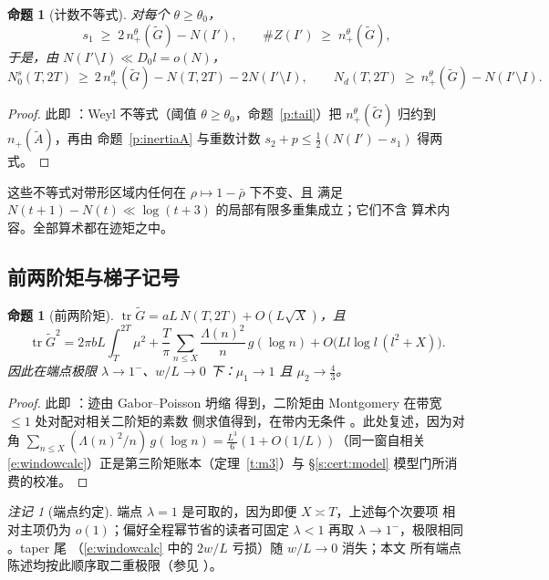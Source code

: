 \documentclass[11pt]{article}
\numberwithin{equation}{section}
\newtheorem{proposition}[theorem]{命题}
\theoremstyle{definition}
\theoremstyle{remark}
\newtheorem{remark}[theorem]{注记}
\newcommand{\LL}{\Lambda}
\begin{document}
\begin{proposition}[计数不等式]\label{p:count}
对每个 $\theta\ge\theta_0$，
\[
s_1\;\ge\;2\,n_+^{\theta}(\widetilde G)-N(I'),
\qquad
\#Z(I')\;\ge\;n_+^{\theta}(\widetilde G),
\]
于是，由 $N(I'\setminus I)\ll D_0l=o(N)$，
\begin{equation}\label{e:count}
N_0^{s}(T,2T)\ \ge\ 2\,n_+^{\theta}(\widetilde G)
-N(T,2T)-2N(I'\setminus I),
\qquad
N_d(T,2T)\ \ge\ n_+^{\theta}(\widetilde G)
-N(I'\setminus I).
\end{equation}
\end{proposition}

\begin{proof}
此即 \cite[命题~4.5]{C26}：Weyl 不等式（阈值
$\theta\ge\theta_0$，命题~\ref{p:tail}）把
$n_+^{\theta}(\widetilde G)$ 归约到 $n_+(\widetilde A)$，再由
命题~\ref{p:inertiaA} 与重数计数
$s_2+p\le\tfrac12(N(I')-s_1)$ 得两式。
\end{proof}

这些不等式对带形区域内任何在 $\rho\mapsto1-\bar\rho$ 下不变、且
满足 $N(t+1)-N(t)\ll\log(t+3)$ 的局部有限多重集成立；它们不含
算术内容。全部算术都在迹矩之中。

\subsection{前两阶矩与梯子记号}\label{s:frame:moments}

\begin{proposition}[前两阶矩]\label{p:mu12}
$\operatorname{tr}\widetilde G=aL\,N(T,2T)+O(L\sqrt X)$，且
\[
\operatorname{tr}\widetilde G^{2}
=2\pi bL\int_T^{2T}\mu^{2}
+\frac{T}{\pi}\sum_{n\le X}\frac{\LL(n)^{2}}{n}\,
g(\log n)+O\bigl(Ll\log l\,(l^{2}+X)\bigr).
\]
因此在端点极限 $\lambda\to1^-$、$w/L\to0$ 下：$\mu_1\to1$ 且
$\mu_2\to\tfrac43$。
\end{proposition}

\begin{proof}
此即 \cite[命题~5.3 与定理~5.8]{C26}：迹由 Gabor--Poisson 坍缩
得到，二阶矩由 Montgomery 在带宽 $\le1$ 处对配对相关二阶矩的素数
侧求值得到，在带内无条件 \cite{Mon73,BGST}。此处复述，因为对角
$\sum_{n\le X}(\LL(n)^{2}/n)\,g(\log n)
=\tfrac{L^{3}}{6}(1+O(1/L))$（同一窗自相关
\eqref{e:windowcalc}）正是第三阶矩账本（定理~\ref{t:m3}）与
\S\ref{s:cert:model} 模型门所消费的校准。
\end{proof}

\begin{remark}[端点约定]\label{r:endpoint}
端点 $\lambda=1$ 是可取的，因为即便 $X\asymp T$，上述每个次要项
相对主项仍为 $o(1)$；偏好全程幂节省的读者可固定 $\lambda<1$ 再取
$\lambda\to1^-$，极限相同 \cite[注记~6.1]{C26}。taper 尾
（\eqref{e:windowcalc} 中的 $2w/L$ 亏损）随 $w/L\to0$ 消失；本文
所有端点陈述均按此顺序取二重极限（参见 \cite[\S7.1]{C26}）。
\end{remark}
\end{document}
